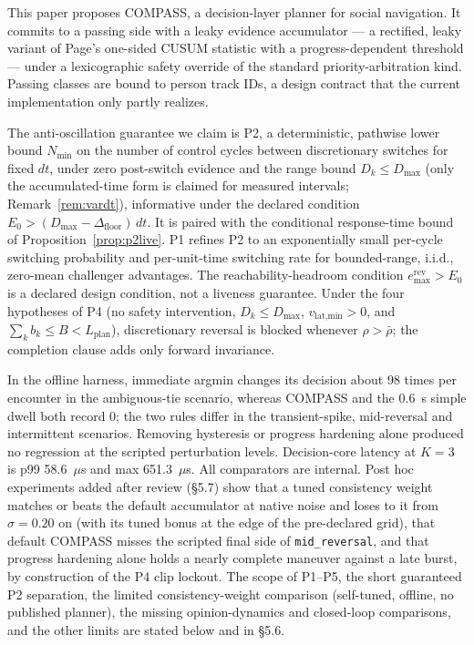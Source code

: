 \documentclass[11pt]{article}
\newcommand{\Dfloor}{\Delta_{\text{floor}}}
\newcommand{\Eremax}{e^{\text{rev}}_{\max}}
\newcommand{\code}[1]{\texttt{#1}}
\begin{document}
This paper proposes COMPASS, a decision-layer planner for social navigation. It commits to a passing side with a leaky evidence accumulator --- a rectified, leaky variant of Page's one-sided CUSUM statistic \cite{page1954cusum} with a progress-dependent threshold --- under a lexicographic safety override of the standard priority-arbitration kind. Passing classes are bound to person track IDs, a design contract that the current implementation only partly realizes.

The anti-oscillation guarantee we claim is P2, a deterministic, pathwise lower bound $N_{\min}$ on the number of control cycles between discretionary switches for fixed $dt$, under zero post-switch evidence and the range bound $D_k\le D_{\max}$ (only the accumulated-time form is claimed for measured intervals; Remark~\ref{rem:vardt}), informative under the declared condition $E_0 > (D_{\max}-\Dfloor)\,dt$. It is paired with the conditional response-time bound of Proposition~\ref{prop:p2live}. P1 refines P2 to an exponentially small per-cycle switching probability and per-unit-time switching rate for bounded-range, i.i.d., zero-mean challenger advantages. The reachability-headroom condition $\Eremax > E_0$ is a declared design condition, not a liveness guarantee. Under the four hypotheses of P4 (no safety intervention, $D_k\le D_{\max}$, $v_{\text{lat,min}}>0$, and $\sum_k b_k\le B<L_{\text{plan}}$), discretionary reversal is blocked whenever $\rho>\bar\rho$; the completion clause adds only forward invariance.

In the offline harness, immediate argmin changes its decision about 98 times per encounter in the ambiguous-tie scenario, whereas COMPASS and the 0.6~s simple dwell both record 0; the two rules differ in the transient-spike, mid-reversal and intermittent scenarios. Removing hysteresis or progress hardening alone produced no regression at the scripted perturbation levels. Decision-core latency at $K=3$ is p99 58.6~$\mu$s and max 651.3~$\mu$s. All comparators are internal. Post hoc experiments added after review (\S5.7) show that a tuned consistency weight matches or beats the default accumulator at native noise and loses to it from $\sigma=0.20$ on (with its tuned bonus at the edge of the pre-declared grid), that default COMPASS misses the scripted final side of \code{mid\_reversal}, and that progress hardening alone holds a nearly complete maneuver against a late burst, by construction of the P4 clip lockout. The scope of P1--P5, the short guaranteed P2 separation, the limited consistency-weight comparison (self-tuned, offline, no published planner), the missing opinion-dynamics and closed-loop comparisons, and the other limits are stated below and in \S5.6.
\end{document}
